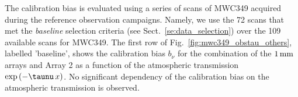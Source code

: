 The calibration bias is evaluated using a
series of scans of MWC349 acquired during the
 reference observation campaigns. Namely, we use the 72 scans that met
 the \emph{baseline} selection
 criteria (see Sect.~\ref{se:data_selection}) over the 109 available
scans for MWC349. The first row of
Fig.~\ref{fig:mwc349_obstau_others}, labelled 'baseline', shows the
calibration bias $b_{\nu}$ for the combination of the $1\,\rm{mm}$ arrays and
Array 2 as a function of the atmospheric transmission %
$\exp \left( - \taunu \, x \right)$. No significant dependency of the
calibration bias on the atmospheric transmission is observed. 


